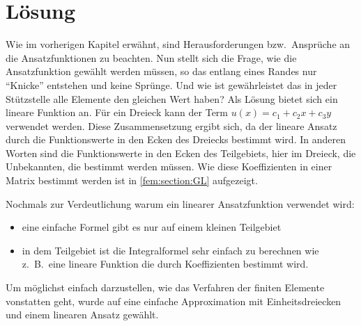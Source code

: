%
%
%
\section{Lösung
\label{fem:section:loesung}}
Wie im vorherigen Kapitel erwähnt, sind Herausforderungen bzw.~Ansprüche
an die Ansatzfunktionen zu beachten.
Nun stellt sich die Frage, wie die Ansatzfunktion gewählt werden
müssen, so das entlang eines Randes nur ``Knicke'' entstehen
und keine Sprünge.
Und wie ist gewährleistet das in jeder Stützstelle alle Elemente
den gleichen Wert haben?
Als Lösung bietet sich ein lineare Funktion an.
Für ein Dreieck kann der Term $u(x) = c_1 + c_2x + c_3y$ verwendet
werden.
Diese Zusammensetzung ergibt sich, da der lineare Ansatz durch die
Funktionswerte in den Ecken des Dreiecks bestimmt wird.
In anderen Worten sind die Funktionswerte in den Ecken
des Teilgebiets, hier im Dreieck, die Unbekannten, die bestimmt
werden müssen.
Wie diese Koeffizienten in einer Matrix bestimmt werden ist in
\ref{fem:section:GL} aufgezeigt.

Nochmals zur Verdeutlichung warum ein linearer Ansatzfunktion verwendet wird:
\begin{itemize}
	\item eine einfache Formel gibt es nur auf einem kleinen Teilgebiet
	\item in dem Teilgebiet ist die Integralformel sehr einfach
	zu berechnen wie z.~B.~eine lineare Funktion die durch
	Koeffizienten bestimmt wird.
\end{itemize}
Um möglichst einfach darzustellen, wie das Verfahren der finiten
Elemente vonstatten geht, wurde auf eine einfache Approximation mit
Einheitsdreiecken und einem linearen Ansatz gewählt.
%

